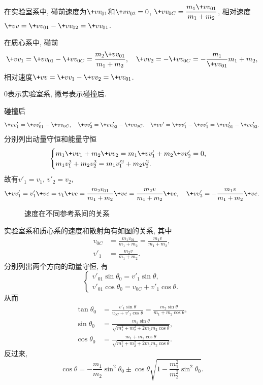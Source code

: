 \documentclass[../LectureNotes.tex]{subfiles}
\begin{document}
\par
在实验室系中, 碰前速度为$\+vv_{01}$和$\+vv_{02} = 0$, $\displaystyle \+vv_{0C} = \frac{m_1 \+vv_{01}}{m_1 + m_2}$, 相对速度$\+vv = \+vv_{01} - \+vv_{02} = \+vv_{01}$.
\par
在质心系中, 碰前
\[ \+vv_1 = \+vv_{01} - \+vv_{0C} = \frac{m_2 \+vv_{01}}{m_1+m_2},\quad \+vv_2 = -\+vv_{0C} = -\frac{m_1}{\+vv_{01}}{m_1+m_2}, \]
相对速度$\+vv = \+vv_1 - \+vv_2 = \+vv_{01}$.
\begin{remark}
    $0$表示实验室系, 撇号表示碰撞后.
\end{remark}
碰撞后
\[ \+vv_1' = \+vv'_{01} - \+vv_{0C},\quad \+vv_2' = \+vv_{02}' - \+vv_{0C}.\quad \+vv' = \+vv'_1 - \+vv'_1 = \+vv'_{01} - \+vv'_{02}. \]
分别列出动量守恒和能量守恒
\[ \begin{cases}
    m_1 \+vv_1 + m_2 \+vv_2 = m_1 \+vv'_1 + m_2 \+vv'_2 = 0,\\
    m_1 v_1^2 + m_2v_2^2 = m_1 v'^2_1 + m_2 v^2_2.
\end{cases} \]
故有$v'_1 = v_1$, $v'_2 = v_2$,
\[ \+vv'_1 = v'_1\+ve = v_1 \+ve = \frac{m_2 v_{01}}{m_1+m_2}\+ve = \frac{m_2 v}{m_1+m_2}\+ve,\quad \+vv'_2 = -\frac{m_1 v}{m_1+m_2}\+ve. \]
\begin{figure}[ht]
    \centering
    \caption{速度在不同参考系间的关系}
    \label{fig:速度在不同参考系间的关系}
\end{figure}
实验室系和质心系的速度和散射角有如图的关系, 其中
\begin{align*}
    v_{0C} &= \frac{m_1 v_{01}}{m_1+m_2} = \frac{m_1 v}{m_1 + m_2}, \\
    v'_1 &= \frac{m_2 v}{m_1+m_2}.
\end{align*}
分别列出两个方向的动量守恒, 有
\[ \begin{cases}
    v'_{01} \sin\theta_0 = v'_1\sin\theta, \\
    v'_{01}\cos\theta_0 = v_{0C} + v'_1\cos\theta.
\end{cases} \]
从而
\begin{align*}
    \tan \theta_0 &= \frac{v'_1 \sin\theta}{v_{0C} + v'_1\cos\theta} = \frac{m_2\sin\theta}{m_1 + m_2\cos\theta}, \\
    \sin\theta_0 &= \frac{m_2 \sin\theta}{\sqrt{m_1^2+m_2^2+2m_1m_2\cos\theta}}, \\
    \cos\theta_0 &= \frac{m_1 + m_2\cos\theta}{\sqrt{m_1^2+m_2^2+2m_1m_2\cos\theta}}.
\end{align*}
反过来,
\begin{equation}
    \label{eq:实验室系和质心系的theta关系}
    \cos\theta = -\frac{m_1}{m_2}\sin^2\theta_0 \pm \cos\theta \sqrt{1 - \frac{m_1^2}{m_2^2}\sin^2\theta_0}.
\end{equation}
\end{document}
